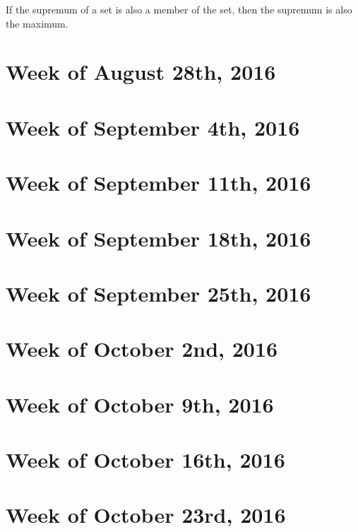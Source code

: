 \documentclass{article}
\begin{document}
\begin{defn}[Maximum]If the supremum of a set is also a member of the set, then the supremum is also the maximum.
\end{defn}



\section{Week of August 28th, 2016}
\section{Week of September 4th, 2016}
\section{Week of September 11th, 2016}
\section{Week of September 18th, 2016}
\section{Week of September 25th, 2016}
\section{Week of October 2nd, 2016}
\section{Week of October 9th, 2016}
\section{Week of October 16th, 2016}
\section{Week of October 23rd, 2016}
\end{document}
